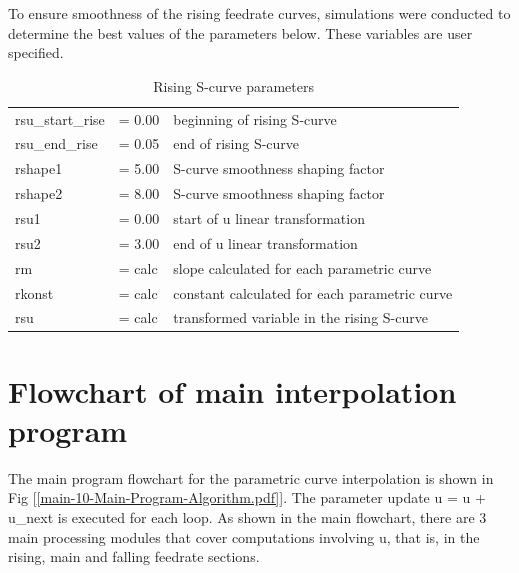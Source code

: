 To ensure smoothness of the rising feedrate curves, simulations were conducted to determine the best values of the parameters below. These variables are user specified.\\

\begin{table}[!ht]
	\begin{center}
	\caption{Rising S-curve parameters}	
	\label{Rising-S-curve-parameters}	
	\begin{tabular}{ p{3.0cm} p{2.0cm} p{8.0cm}}
    \hline 
	rsu\_start\_rise & = 0.00  & beginning of rising S-curve \nonumber \\
	rsu\_end\_rise   & = 0.05  & end of rising S-curve \nonumber \\
	rshape1          & = 5.00  & S-curve smoothness shaping factor \nonumber \\
	rshape2          & = 8.00  & S-curve smoothness shaping factor \nonumber \\
	rsu1             & = 0.00  & start of u linear transformation\nonumber \\
	rsu2             & = 3.00  & end of u linear transformation \nonumber \\
	rm               & = calc  & slope calculated for each parametric curve \nonumber \\
	rkonst			 & = calc  & constant calculated for each parametric curve \nonumber \\ 
	rsu              & = calc  & transformed variable in the rising S-curve \nonumber \\
    \hline
	\end{tabular}
	\end{center}
\end{table}


\clearpage
\pagebreak

\section{Flowchart of main interpolation program}

The main program flowchart for the parametric curve interpolation is shown in Fig [\ref{main-10-Main-Program-Algorithm.pdf}]. The parameter update u = u + u\_next is executed for each loop. As shown in the main flowchart, there are 3 main processing modules that cover computations involving u, that is, in the rising, main and falling feedrate sections. \\

